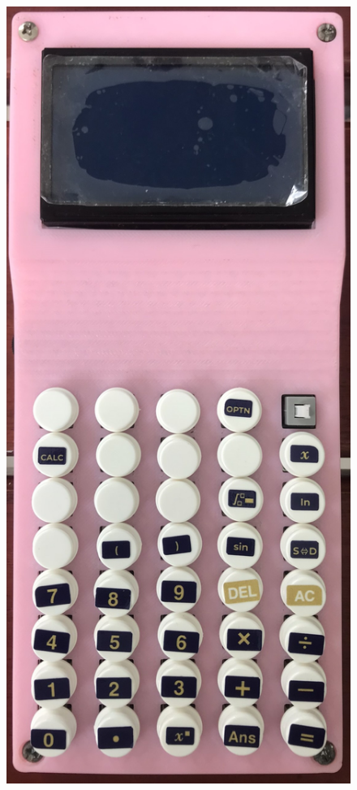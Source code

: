 \documentclass[a4paper, twoside]{report}
\begin{document}
\begin{figure}[H]
    \includegraphics[height=.7\textheight]{3DCase/frontview.jpg}\qquad

\end{figure}
\end{document}
